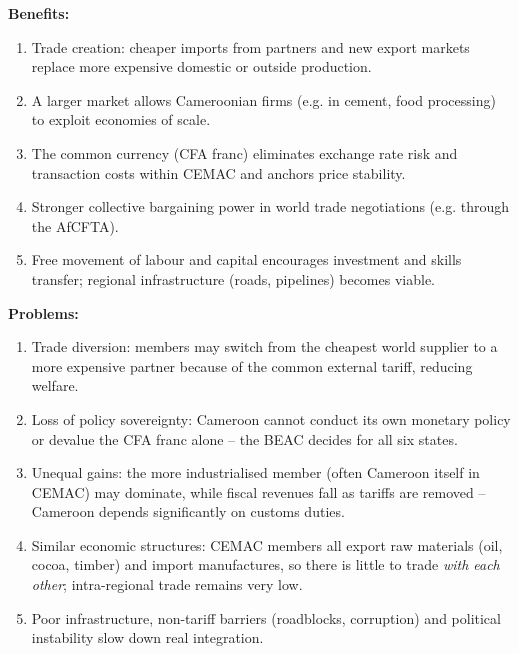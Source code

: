 \documentclass[11pt]{article}
\newcommand{\cle}[1]{{\popxbold\color{popdark}#1}}
\begin{document}
\textbf{Benefits:}
\begin{enumerate}
\item \cle{Trade creation}: cheaper imports from partners and new export markets replace more expensive domestic or outside production.
\item A \cle{larger market} allows Cameroonian firms (e.g. in cement, food processing) to exploit \cle{economies of scale}.
\item The common currency (CFA franc) eliminates \cle{exchange rate risk} and transaction costs within CEMAC and anchors price stability.
\item Stronger \cle{collective bargaining power} in world trade negotiations (e.g. through the AfCFTA).
\item Free movement of labour and capital encourages \cle{investment} and skills transfer; regional infrastructure (roads, pipelines) becomes viable.
\end{enumerate}

\textbf{Problems:}
\begin{enumerate}
\item \cle{Trade diversion}: members may switch from the cheapest world supplier to a more expensive partner because of the common external tariff, reducing welfare.
\item \cle{Loss of policy sovereignty}: Cameroon cannot conduct its own monetary policy or devalue the CFA franc alone -- the BEAC decides for all six states.
\item \cle{Unequal gains}: the more industrialised member (often Cameroon itself in CEMAC) may dominate, while fiscal revenues fall as tariffs are removed -- Cameroon depends significantly on customs duties.
\item \cle{Similar economic structures}: CEMAC members all export raw materials (oil, cocoa, timber) and import manufactures, so there is little to trade \emph{with each other}; intra-regional trade remains very low.
\item Poor infrastructure, non-tariff barriers (roadblocks, corruption) and political instability slow down real integration.
\end{enumerate}
\end{document}
